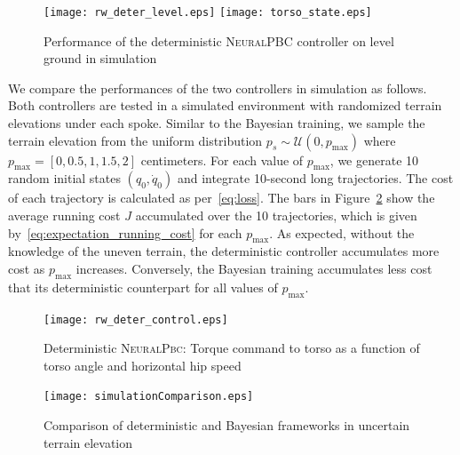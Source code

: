 \begin{figure}[tb]
    \centering
    \texttt{[image: rw\_deter\_level.eps]}\hfill
    \texttt{[image: torso\_state.eps]}
    \caption{Performance of the deterministic \textsc{NeuralPBC} controller on level ground in simulation}
    \label{fig:deter_rw_level}
\end{figure}
%
We compare the performances of the two controllers in simulation as follows.
%
Both controllers are tested in a simulated environment with randomized terrain
elevations under each spoke.
%
Similar to the Bayesian training, we sample the terrain elevation from the
uniform distribution $p_s \sim \mathcal{U}(0, p_{\text{max}})$ where
$p_{\text{max}} = [0, 0.5, 1, 1.5, 2]$ centimeters.
%
For each value of $p_{\text{max}}$, we generate 10 random initial states $(q_0,
\dot{q}_0)$ and integrate 10-second long trajectories.
%
The cost of each trajectory is calculated as per~\eqref{eq:loss}.
%
The bars in Figure~\ref{fig:simulationComparison} show the average running cost
$J$ accumulated over the 10 trajectories, which is given
by~\eqref{eq:expectation_running_cost} for each $p_{\text{max}}$.
%
As expected, without the knowledge of the uneven terrain, the deterministic controller
accumulates more cost as $p_{\text{max}}$ increases.
%
Conversely, the Bayesian training accumulates less cost that its deterministic
counterpart for all values of $p_{\text{max}}$.
%

\begin{figure}[tb]
    \centering
    \begin{minipage}{0.48\linewidth}
        \texttt{[image: rw\_deter\_control.eps]}
        \caption{Deterministic \textsc{NeuralPbc}: Torque command to torso as a function of torso angle and horizontal hip speed}
        \label{fig:deter_control}
    \end{minipage}\hfill
    \begin{minipage}{0.48\linewidth}
        \texttt{[image: simulationComparison.eps]}    
        \caption{Comparison of deterministic and Bayesian frameworks in uncertain terrain elevation}
        \label{fig:simulationComparison}    
    \end{minipage}
\end{figure}

